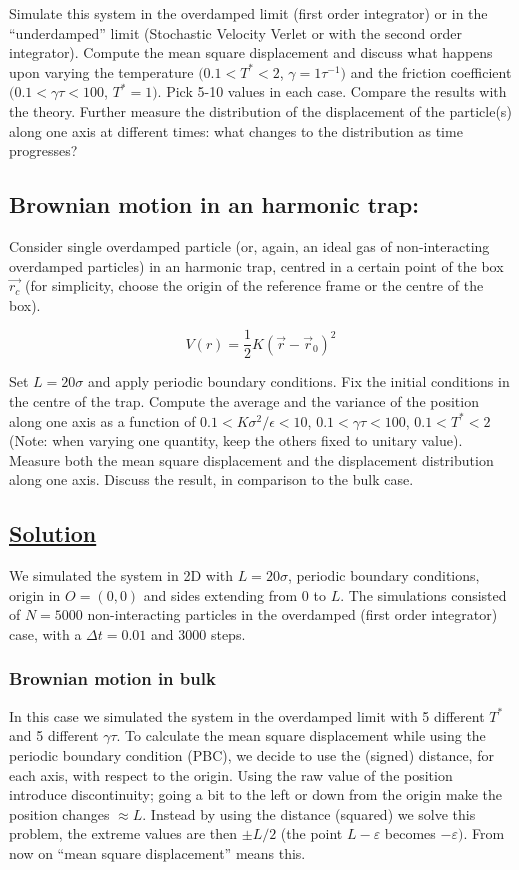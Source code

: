 \documentclass[../main.tex]{subfiles}
\begin{document}
Simulate this system in the overdamped limit (first order integrator) or in the “underdamped” limit (Stochastic Velocity Verlet or with the second order integrator). Compute the mean square displacement and discuss what happens upon varying the temperature $(0.1<T^{*}<2$, $\gamma=1\tau^{-1})$ and the friction coefficient $(0.1<\gamma\tau<100$, $T^{*}=1)$. Pick 5-10 values in each case. Compare the results with the theory. Further measure the distribution of the displacement of the particle(s) along one axis at different times: what changes to the distribution as time progresses?

\subsection*{Brownian motion in an harmonic trap:}

Consider single overdamped particle (or, again, an ideal gas of non-interacting overdamped particles) in an harmonic trap, centred in a certain point of the box $\vec{r_{c}}$ (for simplicity, choose the origin of the reference frame or the centre of the box).

$$V(r)=\frac{1}{2}K(\vec{r}-\vec{r}_{0})^{2}$$

Set $L=20\sigma$ and apply periodic boundary conditions. Fix the initial conditions in the centre of the trap. Compute the average and the variance of the position along one axis as a function of $0.1<K\sigma^{2}/\epsilon<10$, $0.1<\gamma\tau<100$, $0.1<T^{*}<2$ (Note: when varying one quantity, keep the others fixed to unitary value). Measure both the mean square displacement and the displacement distribution along one axis. Discuss the result, in comparison to the bulk case.

\subsection*{\underline{Solution}}
We simulated the system in 2D with $L=20\sigma$, periodic boundary conditions, origin in $O=(0, 0)$ and sides extending from 0 to $L$. The simulations consisted of $N=5000$ non-interacting particles in the overdamped (first order integrator) case, with a $\Delta t = 0.01$ and 3000 steps.

\newpage
\subsubsection*{Brownian motion in bulk}
In this case we simulated the system in the overdamped limit with 5 different $T^*$ and 5 different $\gamma\tau$. To calculate the mean square displacement while using the periodic boundary condition (PBC), we decide to use the (signed) distance, for each axis, with respect to the origin. Using the raw value of the position introduce discontinuity; going a bit to the left or down from the origin make the position changes $\approx L$. Instead by using the distance (squared) we solve this problem, the extreme values are then $\pm L/2$ (the point $L-\varepsilon$ becomes $-\varepsilon)$. From now on ``mean square displacement'' means this.
\end{document}
